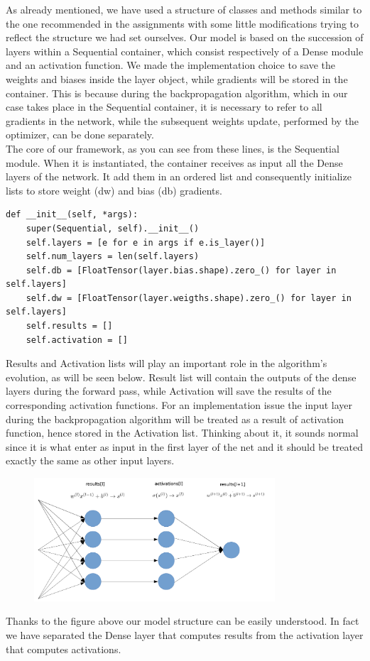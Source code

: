 As already mentioned, we have used a structure of classes and methods similar to the one recommended in the assignments with some little modifications trying to reflect the structure we had set ourselves. Our model is based on the succession of layers within a Sequential container, which consist respectively of a Dense module and an activation function. We made the implementation choice to save the weights and biases inside the layer object, while gradients will be stored in the container. This is because during the backpropagation algorithm, which in our case takes place in the Sequential container, it is necessary to refer to all gradients in the network, while the subsequent weights update, performed by the optimizer, can be done separately. \\
The core of our framework, as you can see from these lines, is the Sequential module. When it is instantiated, the container receives as input all the Dense layers of the network. It add them in an ordered list and consequently initialize lists to store weight (dw) and bias (db) gradients.

\begin{verbatim}
def __init__(self, *args):
	super(Sequential, self).__init__()
	self.layers = [e for e in args if e.is_layer()]
	self.num_layers = len(self.layers)
	self.db = [FloatTensor(layer.bias.shape).zero_() for layer in self.layers]
	self.dw = [FloatTensor(layer.weigths.shape).zero_() for layer in self.layers]
	self.results = [] 
	self.activation = []
\end{verbatim}

Results and Activation lists will play an important role in the algorithm's evolution, as will be seen below. Result list will contain the outputs of the dense layers during the forward pass, while Activation will save the results of the corresponding activation functions. For an implementation issue the input layer during the backpropagation algorithm will be treated as a result of activation function, hence stored in the Activation list. Thinking about it, it sounds normal since it is what enter as input in the first layer of the net and it should be treated exactly the same as other input layers. 
\begin{figure}[H]
	\includegraphics[width=0.8\textwidth]{Images/netowrk.png}
	\centering
\end{figure}
Thanks to the figure above our model structure can be easily understood. In fact we have separated the Dense layer that computes results from the activation layer that computes activations. 
